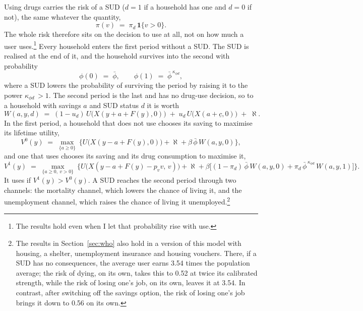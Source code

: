 \documentclass[10pt]{article}
\begin{document}
Using drugs carries the risk of a SUD ($d=1$ if a household has one and $d=0$ if not), the same whatever the quantity,
\begin{equation}\label{eq:hazard}
\pi(v) \;=\; \pi_d\,\mathbf{1}\{v>0\}.
\end{equation}
The whole risk therefore sits on the decision to use
at all, not on how much a user uses.\footnote{The results hold even when I let that probability rise with use.} Every household enters the first period without a SUD. The SUD is realised at the end of it, and the household survives into the second with probability
\begin{equation}\label{eq:surv}
\phi(0) \;=\; \bar\phi, \qquad \phi(1) \;=\; \bar\phi^{\,\kappa_{\phi d}},
\end{equation}
where a SUD lowers the probability of surviving the period by raising it to the power $\kappa_{\phi d}$$\,>1$. The second period is the last and has no drug-use decision, so to a household with savings $a$ and SUD status $d$ it is worth
\begin{equation}\label{eq:w2}
W(a,y,d) \;=\; (1-u_d)\,U\big(X(y+a+F(y),0)\big)\;+\;u_d\,U\big(X(a+\underline c,0)\big)\;+\;\aleph.
\end{equation}
In the first period, a household that does not use chooses its saving to maximise its lifetime utility,
\begin{equation}\label{eq:v0}
V^0(y) \;=\; \max_{\{a\ge0\}}\ \Big\{U\big(X(y-a+F(y),0)\big)+\aleph+\beta\,\bar\phi\,W(a,y,0)\Big\},
\end{equation}
and one that uses chooses its saving and its drug consumption to maximise it,
\begin{equation}\label{eq:v1}
V^1(y) \;=\; \max_{\{a\ge0,\ v>0\}}\ \Big\{U\big(X(y-a+F(y)-p_v v,\,v)\big)+\aleph+\beta\Big[(1-\pi_d)\,\bar\phi\,W(a,y,0)+\pi_d\,\bar\phi^{\,\kappa_{\phi d}}\,W(a,y,1)\Big]\Big\}.
\end{equation}
It uses if $V^1(y)>V^0(y)$. A SUD reaches the second period through two channels: the mortality channel, which lowers the chance of living it, and the unemployment channel, which raises the chance of living it unemployed.\footnote{The results in Section~\ref{sec:who} also hold in a version of this model with housing, a shelter, unemployment insurance and housing vouchers. There, if a SUD has no consequences, the average user earns 3.54 times the population average; the risk of dying, on its own, takes this to 0.52 at twice its calibrated strength, while the risk of losing one's job, on its own, leaves it at 3.54.   In contrast, after switching off the savings option, the risk of losing one's job brings it down to 0.56 on its own.}
\end{document}
